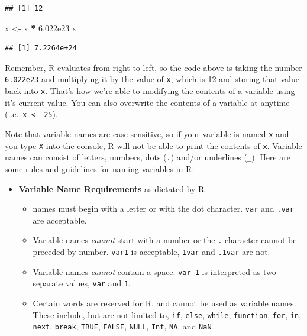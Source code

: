 \documentclass[
]{book}
\newenvironment{Shaded}{\begin{snugshade}}{\end{snugshade}}
\newcommand{\FloatTok}[1]{\textcolor[rgb]{0.00,0.00,0.81}{#1}}
\newcommand{\NormalTok}[1]{#1}
\newcommand{\OtherTok}[1]{\textcolor[rgb]{0.56,0.35,0.01}{#1}}
\newcommand{\SpecialCharTok}[1]{\textcolor[rgb]{0.81,0.36,0.00}{\textbf{#1}}}
\providecommand{\tightlist}{%
  \setlength{\itemsep}{0pt}\setlength{\parskip}{0pt}}
\begin{document}
\begin{verbatim}
## [1] 12
\end{verbatim}

\begin{Shaded}
\begin{Highlighting}[]
\NormalTok{x }\OtherTok{\textless{}{-}}\NormalTok{ x }\SpecialCharTok{*} \FloatTok{6.022e23}
\NormalTok{x}
\end{Highlighting}
\end{Shaded}

\begin{verbatim}
## [1] 7.2264e+24
\end{verbatim}

Remember, R evaluates from right to left, so the code above is taking the number \texttt{6.022e23} and multiplying it by the value of \texttt{x}, which is 12 and storing that value back into \texttt{x}. That's how we're able to modifying the contents of a variable using it's current value. You can also overwrite the contents of a variable at anytime (i.e.~\texttt{x\ \textless{}-\ 25}).

Note that variable names are case sensitive, so if your variable is named \texttt{x} and you type \texttt{X} into the console, R will not be able to print the contents of \texttt{x}. Variable names can consist of letters, numbers, dots (\texttt{.}) and/or underlines (\texttt{\_}). Here are some rules and guidelines for naming variables in R:

\begin{itemize}
\tightlist
\item
  \textbf{Variable Name Requirements} as dictated by R

  \begin{itemize}
  \tightlist
  \item
    names must begin with a letter or with the dot character. \texttt{var} and \texttt{.var} are acceptable.
  \item
    Variable names \emph{cannot} start with a number or the \texttt{.} character cannot be preceded by number. \texttt{var1} is acceptable, \texttt{1var} and \texttt{.1var} are not.
  \item
    Variable names \emph{cannot} contain a space. \texttt{var\ 1} is interpreted as two separate values, \texttt{var} and \texttt{1}.
  \item
    Certain words are reserved for R, and cannot be used as variable names. These include, but are not limited to, \texttt{if}, \texttt{else}, \texttt{while}, \texttt{function}, \texttt{for}, \texttt{in}, \texttt{next}, \texttt{break}, \texttt{TRUE}, \texttt{FALSE}, \texttt{NULL}, \texttt{Inf}, \texttt{NA}, and \texttt{NaN}
  \end{itemize}
\end{itemize}
\end{document}
